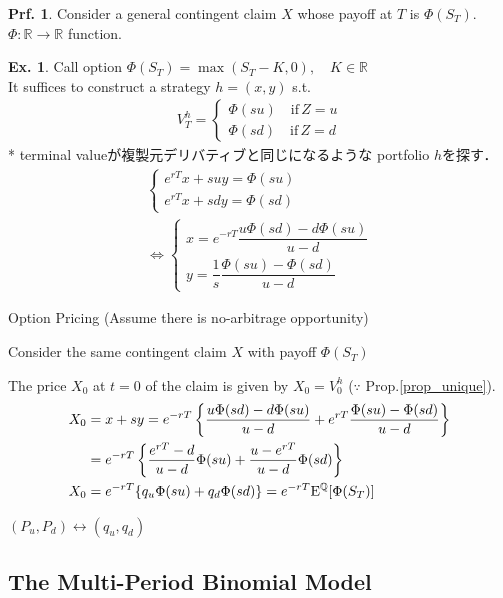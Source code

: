 \documentclass[a4paper,11pt]{jsarticle}
\theoremstyle{definition}
\newtheorem{prf}{Prf.}[subsection]
\newtheorem{ex}{Ex.}[subsection]
\newcommand{\df}[2]{\dfrac{#1}{#2}}
\begin{document}
\begin{prf}
  Consider a general contingent claim $X$
  whose payoff at $T$ is $\Phi(S_T)$.
  $\Phi : \mathbb{R} \to \mathbb{R}$ function.
  \begin{ex}
    Call option $\Phi(S_T)=\max(S_T-K,0), \quad K\in\mathbb{R}$\\
    It suffices to construct a strategy $h=(x,y)$ s.t.
    \begin{align}
      V_T^h=
      \begin{cases}
        \Phi(su) \quad \mbox{if} \, Z=u \\
        \Phi(sd) \quad \mbox{if} \, Z=d
      \end{cases}
    \end{align}
    * terminal valueが複製元デリバティブと同じになるような
    portfolio $h$を探す．
    \begin{align}
      \begin{cases}
        e^{rT}x+suy=\Phi(su) \\
        e^{rT}x+sdy=\Phi(sd) 
      \end{cases} \\
      \Leftrightarrow
      \begin{cases}
        x=e^{-rT} \df{u\Phi(sd)-d\Phi(su)}{u-d} \\
        y=\df{1}{s} \df{\Phi(su)-\Phi(sd)}{u-d}
      \end{cases}
    \end{align}
  \end{ex}
\end{prf}


Option Pricing (Assume there is no-arbitrage opportunity)

Consider the same contingent claim $X$
with payoff $\Phi(S_T)$

The price $X_0$ at $t=0$ of the claim is given by
$X_0=V_0^h$ ($\because$ Prop.\ref{prop_unique}).
\begin{align}
  X_0&=x+sy
  =e^{-rT} \left\{\df{u\Phi(sd)-d\Phi(su)}{u-d}
  +e^{rT} \df{\Phi(su)-\Phi(sd)}{u-d} \right\} \notag \\
  &=e^{-rT} \left\{ \df{e^{rT}-d}{u-d} \Phi(su)
  + \df{u-e^{rT}}{u-d} \Phi(sd) \right\}  \\
  X_0 &=e^{-rT}\{ q_u\Phi(su)+q_d\Phi(sd) \}
  =e^{-rT}\mathrm{E}^{\mathbb{Q}}[\Phi(S_T)]
\end{align}

$(P_u,P_d)\leftrightarrow (q_u,q_d)$


\subsection{The Multi-Period Binomial Model}
\end{document}
